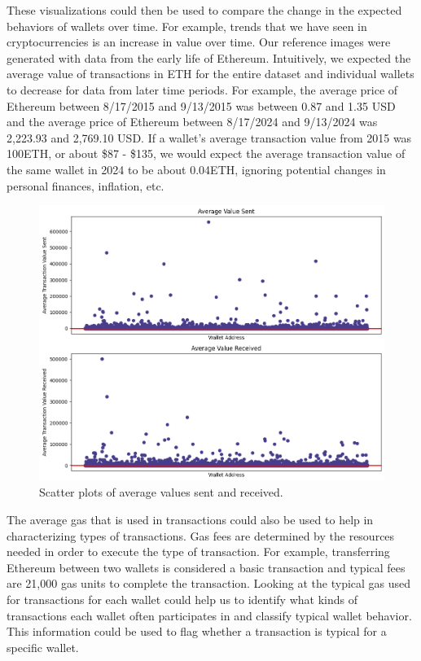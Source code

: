 \documentclass[sigconf]{acmart}
\begin{document}
	These visualizations could then be used to compare the change in the expected behaviors of wallets over time. For example, trends that we have seen in cryptocurrencies is an increase in value over time. Our reference images were generated with data from the early life of Ethereum. Intuitively, we expected the average value of transactions in ETH for the entire dataset and individual wallets to decrease for data from later time periods. For example, the average price of Ethereum between 8/17/2015 and 9/13/2015 was between 0.87 and 1.35 USD and the average price of Ethereum between 8/17/2024 and 9/13/2024 was 2,223.93 and 2,769.10 USD. If a wallet’s average transaction value from 2015 was 100ETH, or about \$87 - \$135, we would expect the average transaction value of the same wallet in 2024 to be about 0.04ETH, ignoring potential changes in personal finances, inflation, etc. 

\begin{figure}[H]
    \centering
    \includegraphics[width=0.8\linewidth]{M6-2-avg-val.png}
    \caption{Scatter plots of average values sent and received.}
    \label{fig:m6StackedAvgVal}
\end{figure}

The average gas that is used in transactions could also be used to help in characterizing types of transactions. Gas fees are determined by the resources needed in order to execute the type of transaction. For example, transferring Ethereum between two wallets is considered a basic transaction and typical fees are 21,000 gas units to complete the transaction. Looking at the typical gas used for transactions for each wallet could help us to identify what kinds of transactions each wallet often participates in and classify typical wallet behavior. This information could be used to flag whether a transaction is typical for a specific wallet.
\end{document}
